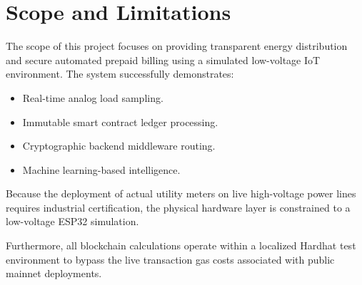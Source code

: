 \section{Scope and Limitations}

The scope of this project focuses on providing transparent energy distribution and secure automated prepaid billing using a simulated low-voltage IoT environment. The system successfully demonstrates:

\begin{itemize}
\item Real-time analog load sampling.
\item Immutable smart contract ledger processing.
\item Cryptographic backend middleware routing.
\item Machine learning-based intelligence.
\end{itemize}

Because the deployment of actual utility meters on live high-voltage power lines requires industrial certification, the physical hardware layer is constrained to a low-voltage ESP32 simulation.

Furthermore, all blockchain calculations operate within a localized Hardhat test environment to bypass the live transaction gas costs associated with public mainnet deployments.